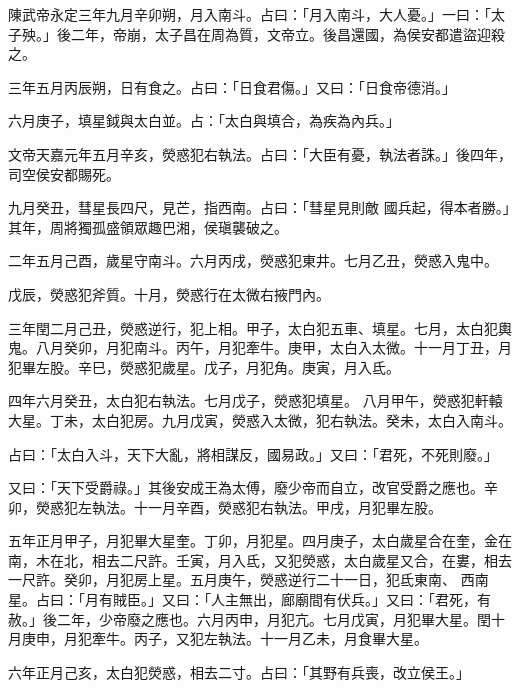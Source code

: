 \begin{pinyinscope}
 陳武帝永定三年九月辛卯朔，月入南斗。占曰：「月入南斗，大人憂。」一曰：「太子殃。」後二年，帝崩，太子昌在周為質，文帝立。後昌還國，為侯安都遣盜迎殺之。



 三年五月丙辰朔，日有食之。占曰：「日食君傷。」又曰：「日食帝德消。」



 六月庚子，填星鉞與太白並。占：「太白與填合，為疾為內兵。」



 文帝天嘉元年五月辛亥，熒惑犯右執法。占曰：「大臣有憂，執法者誅。」後四年，司空侯安都賜死。



 九月癸丑，彗星長四尺，見芒，指西南。占曰：「彗星見則敵
 國兵起，得本者勝。」其年，周將獨孤盛領眾趣巴湘，侯瑱襲破之。



 二年五月己酉，歲星守南斗。六月丙戌，熒惑犯東井。七月乙丑，熒惑入鬼中。



 戊辰，熒惑犯斧質。十月，熒惑行在太微右掖門內。



 三年閏二月己丑，熒惑逆行，犯上相。甲子，太白犯五車、填星。七月，太白犯輿鬼。八月癸卯，月犯南斗。丙午，月犯牽牛。庚甲，太白入太微。十一月丁丑，月犯畢左股。辛巳，熒惑犯歲星。戊子，月犯角。庚寅，月入氐。



 四年六月癸丑，太白犯右執法。七月戊子，熒惑犯填星。
 八月甲午，熒惑犯軒轅大星。丁未，太白犯房。九月戊寅，熒惑入太微，犯右執法。癸未，太白入南斗。



 占曰：「太白入斗，天下大亂，將相謀反，國易政。」又曰：「君死，不死則廢。」



 又曰：「天下受爵祿。」其後安成王為太傅，廢少帝而自立，改官受爵之應也。辛卯，熒惑犯左執法。十一月辛酉，熒惑犯右執法。甲戌，月犯畢左股。



 五年正月甲子，月犯畢大星奎。丁卯，月犯星。四月庚子，太白歲星合在奎，金在南，木在北，相去二尺許。壬寅，月入氐，又犯熒惑，太白歲星又合，在婁，相去一尺許。癸卯，月犯房上星。五月庚午，熒惑逆行二十一日，犯氐東南、
 西南星。占曰：「月有賊臣。」又曰：「人主無出，廊廟間有伏兵。」又曰：「君死，有赦。」後二年，少帝廢之應也。六月丙申，月犯亢。七月戊寅，月犯畢大星。閏十月庚申，月犯牽牛。丙子，又犯左執法。十一月乙未，月食畢大星。



 六年正月己亥，太白犯熒惑，相去二寸。占曰：「其野有兵喪，改立侯王。」




\end{pinyinscope}
